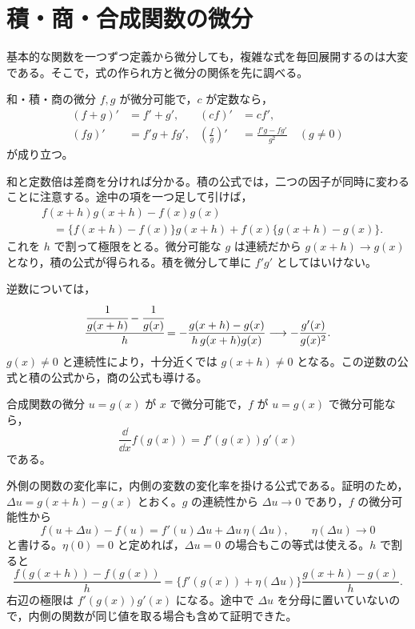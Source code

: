 \section{積・商・合成関数の微分}\label{節:微分法則}
基本的な関数を一つずつ定義から微分しても，複雑な式を毎回展開するのは大変である。そこで，式の作られ方と微分の関係を先に調べる。

\begin{theorem}{和・積・商の微分}
$f,g$ が微分可能で，$c$ が定数なら，
\begin{align*}
 (f+g)'&=f'+g',& (cf)'&=cf',\\
 (fg)'&=f'g+fg',&
 \left(\frac fg\right)'&=\frac{f'g-fg'}{g^2}\quad(g\ne0)
\end{align*}
が成り立つ。
\end{theorem}

和と定数倍は差商を分ければ分かる。積の公式では，二つの因子が同時に変わることに注意する。途中の項を一つ足して引けば，
\begin{align*}
 &f(x+h)g(x+h)-f(x)g(x)\\
 &\quad=\{f(x+h)-f(x)\}g(x+h)
       +f(x)\{g(x+h)-g(x)\}.
\end{align*}
これを $h$ で割って極限をとる。微分可能な $g$ は連続だから $g(x+h)\to g(x)$ となり，積の公式が得られる。積を微分して単に $f'g'$ としてはいけない。

逆数については，
\[
 \cfrac{\cfrac1{g(x+h)}-\cfrac1{g(x)}}h
 =-\frac{g(x+h)-g(x)}{h\,g(x+h)g(x)}
 \longrightarrow-\frac{g'(x)}{g(x)^2}.
\]
$g(x)\ne0$ と連続性により，十分近くでは $g(x+h)\ne0$ となる。この逆数の公式と積の公式から，商の公式も導ける。

\begin{theorem}{合成関数の微分}\label{定理:合成微分}
$u=g(x)$ が $x$ で微分可能で，$f$ が $u=g(x)$ で微分可能なら，
\[
 \frac{\dd}{\dd x}f(g(x))=f'(g(x))g'(x)
\]
である。
\end{theorem}

外側の関数の変化率に，内側の変数の変化率を掛ける公式である。証明のため，$\Delta u=g(x+h)-g(x)$ とおく。$g$ の連続性から $\Delta u\to0$ であり，$f$ の微分可能性から
\[
 f(u+\Delta u)-f(u)=f'(u)\Delta u+\Delta u\,\eta(\Delta u),
 \qquad \eta(\Delta u)\to0
\]
と書ける。$\eta(0)=0$ と定めれば，$\Delta u=0$ の場合もこの等式は使える。$h$ で割ると
\[
 \frac{f(g(x+h))-f(g(x))}h
 =\{f'(g(x))+\eta(\Delta u)\}
   \frac{g(x+h)-g(x)}h.
\]
右辺の極限は $f'(g(x))g'(x)$ になる。途中で $\Delta u$ を分母に置いていないので，内側の関数が同じ値を取る場合も含めて証明できた。


